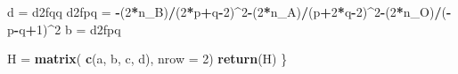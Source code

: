 \documentclass[]{article}
\newenvironment{Shaded}{\begin{snugshade}}{\end{snugshade}}
\newcommand{\KeywordTok}[1]{\textcolor[rgb]{0.13,0.29,0.53}{\textbf{#1}}}
\newcommand{\DataTypeTok}[1]{\textcolor[rgb]{0.13,0.29,0.53}{#1}}
\newcommand{\DecValTok}[1]{\textcolor[rgb]{0.00,0.00,0.81}{#1}}
\newcommand{\StringTok}[1]{\textcolor[rgb]{0.31,0.60,0.02}{#1}}
\newcommand{\OperatorTok}[1]{\textcolor[rgb]{0.81,0.36,0.00}{\textbf{#1}}}
\newcommand{\NormalTok}[1]{#1}
\begin{document}
\begin{Shaded}
\begin{Highlighting}[]
\NormalTok{    d =}\StringTok{ }\NormalTok{d2fqq}
\NormalTok{    d2fpq =}\StringTok{ }\OperatorTok{-}\NormalTok{(}\DecValTok{2}\OperatorTok{*}\NormalTok{n_B)}\OperatorTok{/}\NormalTok{(}\DecValTok{2}\OperatorTok{*}\NormalTok{p}\OperatorTok{+}\NormalTok{q}\OperatorTok{-}\DecValTok{2}\NormalTok{)}\OperatorTok{^}\DecValTok{2}\OperatorTok{-}\NormalTok{(}\DecValTok{2}\OperatorTok{*}\NormalTok{n_A)}\OperatorTok{/}\NormalTok{(p}\OperatorTok{+}\DecValTok{2}\OperatorTok{*}\NormalTok{q}\OperatorTok{-}\DecValTok{2}\NormalTok{)}\OperatorTok{^}\DecValTok{2}\OperatorTok{-}\NormalTok{(}\DecValTok{2}\OperatorTok{*}\NormalTok{n_O)}\OperatorTok{/}\NormalTok{(}\OperatorTok{-}\NormalTok{p}\OperatorTok{-}\NormalTok{q}\OperatorTok{+}\DecValTok{1}\NormalTok{)}\OperatorTok{^}\DecValTok{2}
\NormalTok{    b =}\StringTok{ }\NormalTok{d2fpq}
    
\NormalTok{    H =}\StringTok{ }\KeywordTok{matrix}\NormalTok{( }\KeywordTok{c}\NormalTok{(a, b, c, d), }\DataTypeTok{nrow =} \DecValTok{2}\NormalTok{)}
    \KeywordTok{return}\NormalTok{(H)}
\NormalTok{\}}
\end{Highlighting}
\end{Shaded}
\end{document}
